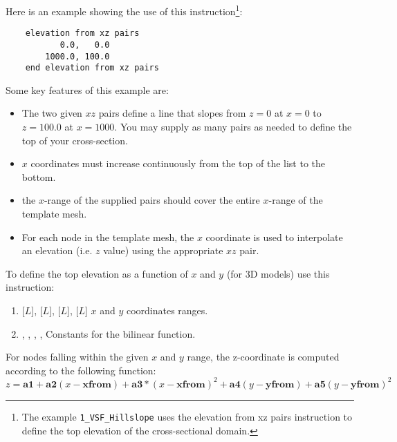 Here is an example showing the use of this instruction\footnote{The example \texttt{1\_VSF\_Hillslope} uses the \textsf{elevation from xz pairs} instruction to define the top elevation of the cross-sectional domain.}:
    \begin{verbatim}
    elevation from xz pairs
           0.0,   0.0
        1000.0, 100.0
    end elevation from xz pairs
     \end{verbatim}
     \squish
Some key features of this example are:
\begin{itemize}
  \item The two given $xz$ pairs define a line that slopes from $z=0$ at $x=0$ to $z=100.0$ at $x=1000$.  You may supply as many pairs as needed to define the top of your cross-section.
  \item $x$ coordinates must increase continuously from the top of the list to the bottom.
  \item the $x$-range of the supplied pairs should cover the entire $x$-range of the template mesh.
  \item For each node in the template mesh, the $x$ coordinate is used to interpolate an elevation (i.e. $z$ value) using the appropriate $xz$ pair.
\end{itemize}

To define the top elevation as a function of $x$ and $y$ (for 3D models) use this instruction:

    {
    \squish
    \begin{enumerate}
    \item {} [$L$],  [$L$],  [$L$],  [$L$]  $x$ and $y$ coordinates ranges.
    \item {}, , , ,   Constants for the bilinear function.
    \end{enumerate}
    For nodes falling within the given $x$ and $y$ range, the z-coordinate is
    computed according to the following function:
    \begin{displaymath}
        z = \textbf{a1} + \textbf{a2} (x-\textbf{xfrom}) + \textbf{a3}*(x-\textbf{xfrom})^2
            + \textbf{a4}(y-\textbf{yfrom}) + \textbf{a5}(y-\textbf{yfrom})^2
    \end{displaymath}
    }

